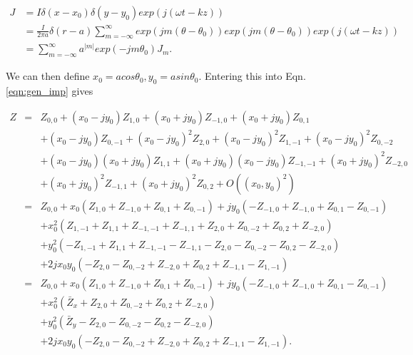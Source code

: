 \documentclass[12pt,a4paper,twopage,openright]{article}
\begin{document}
\begin{align}
J & = I \delta \left( x-x_{0} \right)\delta \left( y-y_{0} \right) exp\left( j \left(\omega t -kz \right)\right) \nonumber \\
  & = \frac{I}{2\pi a} \delta \left( r-a \right)\displaystyle\sum\limits_{m=-\infty}^{\infty} exp\left( jm \left( \theta -\theta_{0} \right) \right) exp\left( jm \left( \theta -\theta_{0} \right) \right) exp\left( j \left( \omega t - kz \right) \right) \nonumber \\
  & = \displaystyle\sum\limits_{m=-\infty}^{\infty} a^{|m|}exp\left( -jm\theta_{0} \right)J_{m}.
\end{align}

We can then define $x_{0}=acos\theta_{0}, y_{0}=asin\theta_{0}$. Entering this into Eqn. \ref{eqn:gen_imp} gives

\begin{align}
Z &=&Z_{0,0} +  \left( x_{0} - jy_{0} \right) Z_{1,0} + \left( x_{0} + jy_{0} \right)  Z_{-1,0} + \left( x_{0} + jy_{0} \right) Z_{0,1} \nonumber \\
   &   &+ \left( x_{0} - jy_{0} \right) Z_{0,-1} + \left( x_{0} - jy_{0} \right)^{2} Z_{2,0} + \left( x_{0} - jy_{0} \right)^{2} Z_{1,-1} + \left( x_{0} - jy_{0} \right) ^{2}Z_{0,-2} \nonumber \\
   &   &+\left( x_{0} - jy_{0} \right) \left( x_{0} + jy_{0} \right) Z_{1,1} + \left( x_{0} + jy_{0} \right)\left( x_{0} - jy_{0} \right) Z_{-1,-1} + \left( x_{0} + jy_{0} \right)^{2}Z_{-2,0} \nonumber \\
   &   &+\left( x_{0} + jy_{0} \right)^{2} Z_{-1,1} + \left( x_{0} + jy_{0} \right)^{2}Z_{0,2} + O\left( \left(x_{0},y_{0} \right)^{2} \right) \nonumber \\
   &=&Z_{0,0} + x_{0}\left( Z_{1,0}+Z_{-1,0}+Z_{0,1}+Z_{0,-1} \right) +jy_{0} \left( -Z_{-1,0} + Z_{-1,0} + Z_{0,1} - Z_{0,-1} \right) \nonumber \\
   &   &+x_{0}^{2} \left(  Z_{1,-1}+Z_{1,1}+Z_{-1,-1}+Z_{-1,1} + Z_{2,0} + Z_{0,-2} + Z_{0,2} + Z_{-2,0} \right) \nonumber \\
   &   &+y_{0}^{2} \left(  -Z_{1,-1}+Z_{1,1}+Z_{-1,-1}-Z_{-1,1} - Z_{2,0} - Z_{0,-2} - Z_{0,2} - Z_{-2,0} \right) \nonumber \\
   &   &+2jx_{0}y_{0}\left( -Z_{2,0} - Z_{0,-2} + Z_{-2,0} + Z_{0,2} + Z_{-1,1} - Z_{1,-1} \right) \nonumber \\
   &=&Z_{0,0} + x_{0}\left( Z_{1,0}+Z_{-1,0}+Z_{0,1}+Z_{0,-1} \right) +jy_{0} \left( -Z_{-1,0} + Z_{-1,0} + Z_{0,1} - Z_{0,-1} \right) \nonumber \\
   &   &+x_{0}^{2} \left( \bar{Z}_{x} + Z_{2,0} + Z_{0,-2} + Z_{0,2} + Z_{-2,0} \right) \nonumber \\
   &   &+y_{0}^{2} \left( \bar{Z}_{y} - Z_{2,0} - Z_{0,-2} - Z_{0,2} - Z_{-2,0} \right) \nonumber \\
   &   &+2jx_{0}y_{0}\left( -Z_{2,0} - Z_{0,-2} + Z_{-2,0} + Z_{0,2} + Z_{-1,1} - Z_{1,-1} \right).
\label{eqn:gen_single_wire}
\end{align}
\end{document}
